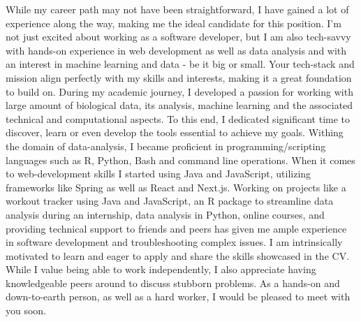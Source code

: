 \documentclass[11pt, a4paper]{awesome-cv}
\begin{document}
\begin{cvletter}
While my career path may not have been straightforward, I have gained a lot of experience along the way, making me the ideal candidate for this position.
I'm not just excited about working as a software developer, but I am also tech-savvy with hands-on experience in web development as well as data analysis and with an interest in machine learning and data - be it big or small. 
Your tech-stack and mission align perfectly with my skills and interests, making it a great foundation to build on.
During my academic journey, I developed a passion for working with large amount of biological data, its analysis, machine learning and the associated technical and computational aspects.
To this end, I dedicated significant time to discover, learn or even develop the tools essential to achieve my goals.
Withing the domain of data-analysis, I became proficient in programming/scripting languages such as R, Python, Bash and command line operations.
When it comes to web-development skills I started using Java and JavaScript, utilizing frameworks like Spring as well as React and Next.js.
Working on projects like a workout tracker using Java and JavaScript, an R package to streamline data analysis during an internship, data analysis in Python, online courses, and providing technical support to friends and peers has given me ample experience in software development and troubleshooting complex issues.
I am intrinsically motivated to learn and eager to apply and share the skills showcased in the CV. 
While I value being able to work independently, I also appreciate having knowledgeable peers around to discuss stubborn problems. 
As a hands-on and down-to-earth person, as well as a hard worker, I would be pleased to meet with you soon.
\end{cvletter}
\makeletterclosing
\end{document}
